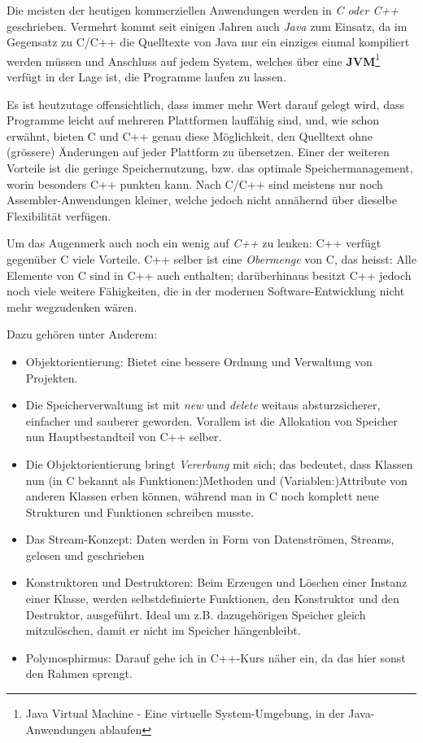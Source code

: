 \documentclass[b5paper,10pt,dvips,fleqn,titlepage,twoside]{book}
\begin{document}
Die meisten der heutigen kommerziellen Anwendungen werden in \emph{C oder C++} geschrieben. Vermehrt kommt seit einigen Jahren auch \emph{Java} zum Einsatz, da im Gegensatz zu C/C++ die Quelltexte von Java nur ein einziges einmal kompiliert werden müssen und Anschluss auf jedem System, welches über eine \textbf{JVM}\footnote{Java Virtual Machine - Eine virtuelle System-Umgebung, in der Java-Anwendungen ablaufen} verfügt in der Lage ist, die Programme laufen zu lassen.

Es ist heutzutage offensichtlich, dass immer mehr Wert darauf gelegt wird, dass Programme leicht auf mehreren Plattformen lauffähig sind, und, wie schon erwähnt, bieten C und C++ genau diese Möglichkeit, den Quelltext ohne (grössere) Änderungen auf jeder Plattform zu übersetzen. Einer der weiteren Vorteile ist die geringe Speichernutzung, bzw. das optimale Speichermanagement, worin besonders C++ punkten kann. Nach C/C++ sind meistens nur noch Assembler-Anwendungen kleiner, welche jedoch nicht annähernd über dieselbe Flexibilität verfügen.

Um das Augenmerk auch noch ein wenig auf \emph{C++} zu lenken: C++ verfügt gegenüber C viele Vorteile. C++ selber ist eine \emph{Obermenge} von C, das heisst: Alle Elemente von C sind in C++ auch enthalten; darüberhinaus besitzt C++ jedoch noch viele weitere Fähigkeiten, die in der modernen Software-Entwicklung nicht mehr wegzudenken wären.

Dazu gehören unter Anderem:\newline

\begin{itemize}
 \item Objektorientierung: Bietet eine bessere Ordnung und Verwaltung von Projekten.
\item Die Speicherverwaltung ist mit \emph{new} und \emph{delete} weitaus absturzsicherer, einfacher und sauberer geworden. Vorallem ist die Allokation von Speicher nun Hauptbestandteil von C++ selber.
\item Die Objektorientierung bringt \emph{Vererbung} mit sich; das bedeutet, dass Klassen nun (in C bekannt als Funktionen:)Methoden und (Variablen:)Attribute von anderen Klassen erben können, während man in C noch komplett neue Strukturen und Funktionen schreiben musste.
\item Das Stream-Konzept: Daten werden in Form von Datenströmen, Streams, gelesen und geschrieben
\item Konstruktoren und Destruktoren: Beim Erzeugen und Löschen einer Instanz einer Klasse, werden selbstdefinierte Funktionen, den Konstruktor und den Destruktor, ausgeführt. Ideal um z.B. dazugehörigen Speicher gleich mitzulöschen, damit er nicht im Speicher hängenbleibt.
\item Polymosphirmus: Darauf gehe ich in C++-Kurs näher ein, da das hier sonst den Rahmen sprengt.
\end{itemize}
\end{document}
